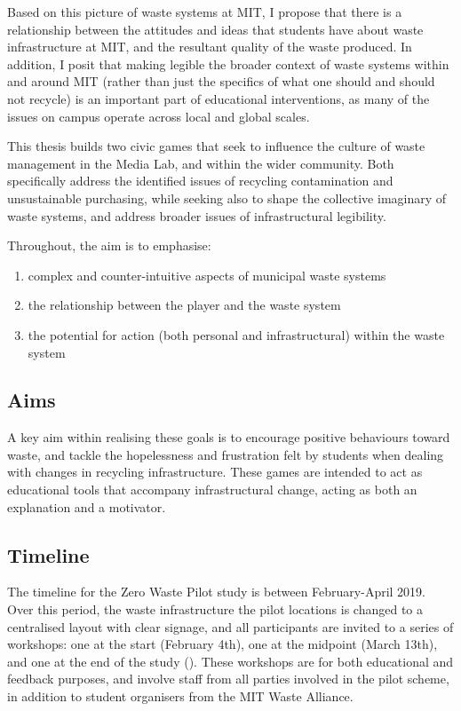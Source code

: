 \documentclass[nofonts,nols,justified,nobib]{tufte-book}
\begin{document}
Based on this picture of waste systems at MIT, I propose that there is a relationship between the attitudes and ideas that students have about waste infrastructure at MIT, and the resultant quality of the waste produced. In addition, I posit that making legible the broader context of waste systems within and around MIT (rather than just the specifics of what one should and should not recycle) is an important part of educational interventions, as many of the issues on campus operate across local and global scales.

This thesis builds two civic games that seek to influence the culture of waste management in the Media Lab, and within the wider community. Both specifically address the identified issues of recycling contamination and unsustainable purchasing, while seeking also to shape the collective imaginary of waste systems, and address broader issues of infrastructural legibility. 

Throughout, the aim is to emphasise: 
\begin{enumerate}
\item complex and counter-intuitive aspects of municipal waste systems
\item the relationship between the player and the waste system
\item the potential for action (both personal and infrastructural) within the waste system
\end{enumerate}

\subsection*{Aims}

A key aim within realising these goals is to encourage positive behaviours toward waste, and tackle the hopelessness and frustration felt by students when dealing with changes in recycling infrastructure. These games are intended to act as educational tools that accompany infrastructural change, acting as both an explanation and a motivator.

\subsection*{Timeline}

The timeline for the Zero Waste Pilot study is between February-April 2019. Over this period, the waste infrastructure the pilot locations is changed to a centralised layout with clear signage, and all participants are invited to a series of workshops: one at the start (February 4th), one at the midpoint (March 13th), and one at the end of the study (). These workshops are for both educational and feedback purposes, and involve staff from all parties involved in the pilot scheme, in addition to student organisers from the MIT Waste Alliance.
\end{document}
